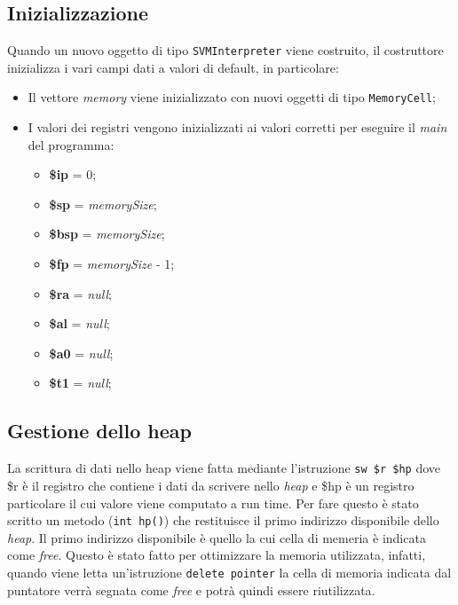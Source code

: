\documentclass[../main.tex]{subfiles}
\begin{document}
\subsection{Inizializzazione}
Quando un nuovo oggetto di tipo \verb|SVMInterpreter| viene costruito, il costruttore inizializza i vari campi dati a valori di default, in particolare:
\begin{itemize}
    \item Il vettore \textit{memory} viene inizializzato con nuovi oggetti di tipo \verb|MemoryCell|;
    \item I valori dei registri vengono inizializzati ai valori corretti per eseguire il \textit{main} del programma:
        \begin{itemize}
            \item \textbf{\$ip} = 0;
            \item \textbf{\$sp} = \textit{memorySize};
            \item \textbf{\$bsp} = \textit{memorySize};
            \item \textbf{\$fp} = \textit{memorySize} - 1;
            \item \textbf{\$ra} = \textit{null};
            \item \textbf{\$al} = \textit{null};
            \item \textbf{\$a0} = \textit{null};
            \item \textbf{\$t1} = \textit{null};
        \end{itemize}
\end{itemize}

\subsection{Gestione dello heap}
La scrittura di dati nello heap viene fatta mediante l'istruzione \verb|sw $r $hp| dove \$r \`e il registro che contiene i dati da scrivere nello \textit{heap} e \$hp \`e un registro particolare il cui valore viene computato a run time. Per fare questo \`e stato scritto un metodo (\verb|int hp()|) che restituisce il primo indirizzo disponibile dello \textit{heap}. Il primo indirizzo disponibile \`e quello la cui cella di memeria \`e indicata come \textit{free}. Questo \`e stato fatto per ottimizzare la memoria utilizzata, infatti, quando viene letta un'istruzione \verb|delete pointer| la cella di memoria indicata dal puntatore verr\`a segnata come \textit{free} e potr\`a quindi essere riutilizzata.
\end{document}
